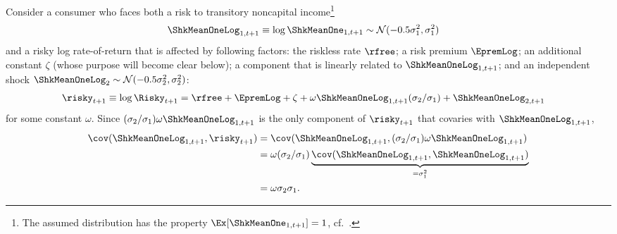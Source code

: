 \documentclass{handout}
\begin{document}
Consider a consumer who faces both a risk to transitory noncapital income\footnote{The assumed distribution has the property $\Ex[\ShkMeanOne_{1,t+1}]=1$, cf.\ \MathFactsList.}
\begin{equation}\begin{gathered}\begin{aligned}
   \ShkMeanOneLog_{1,t+1} \equiv \log \ShkMeanOne_{1,t+1}  & \sim  \mathcal{N}(-0.5\sigma^{2}_{1},\sigma^{2}_{1})
\end{aligned}\end{gathered}\end{equation}
and a risky log rate-of-return that is affected by following factors: the riskless rate $\rfree$; 
a risk premium $\EpremLog$; an additional constant $\zeta$ (whose purpose will become clear below); a component
that is linearly related to $\ShkMeanOneLog_{1,t+1} $; and an independent shock $\ShkMeanOneLog_{2} \sim
\mathcal{N}(-0.5 \sigma^{2}_{2},\sigma^{2}_{2})$:
\begin{equation}\begin{gathered}\begin{aligned}
  {\risky}_{t+1} \equiv \log {\Risky}_{t+1} & =  \rfree+\EpremLog+\zeta + \omega \ShkMeanOneLog_{1,t+1} (\sigma_{2}/\sigma_{1})   + \ShkMeanOneLog_{2,t+1} \label{corrToCov}
\end{aligned}\end{gathered}\end{equation}
for some constant $\omega$.  Since $(\sigma_{2}/\sigma_{1}) \omega \ShkMeanOneLog_{1,t+1} $ is the only component of $\risky_{t+1}$ that covaries with $\ShkMeanOneLog_{1,t+1}$,
\begin{equation*}\begin{gathered}\begin{aligned}
  \cov(\ShkMeanOneLog_{1,t+1} ,\risky_{t+1}) & =  \cov(\ShkMeanOneLog_{1,t+1} , (\sigma_{2}/\sigma_{1}) \omega \ShkMeanOneLog_{1,t+1} )
\\ & =  \omega (\sigma_{2}/\sigma_{1}) \underbrace{\cov(\ShkMeanOneLog_{1,t+1} ,\ShkMeanOneLog_{1,t+1} )}_{=\sigma^{2}_{1}}
\\ & =  \omega \sigma_{2}\sigma_{1}
.
\end{aligned}\end{gathered}\end{equation*}
\end{document}
